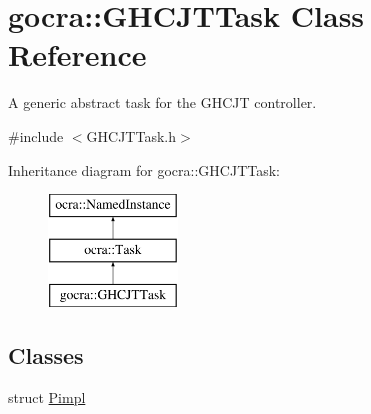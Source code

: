 \hypertarget{classgocra_1_1GHCJTTask}{}\section{gocra\+:\+:G\+H\+C\+J\+T\+Task Class Reference}
\label{classgocra_1_1GHCJTTask}


A generic abstract task for the G\+H\+C\+JT controller.  




{\ttfamily \#include $<$G\+H\+C\+J\+T\+Task.\+h$>$}

Inheritance diagram for gocra\+:\+:G\+H\+C\+J\+T\+Task\+:\begin{figure}[H]
\begin{center}
\leavevmode
\includegraphics[height=3.000000cm]{d2/d46/classgocra_1_1GHCJTTask}
\end{center}
\end{figure}
\subsection*{Classes}
\begin{DoxyCompactItemize}
\item 
struct \hyperlink{structgocra_1_1GHCJTTask_1_1Pimpl}{Pimpl}
\end{DoxyCompactItemize}
